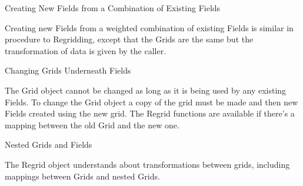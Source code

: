 \begin{description}
\item{Creating New Fields from a Combination of Existing Fields}

Creating new Fields from a weighted combination of existing
Fields is similar in procedure to Regridding, except that the
Grids are the same but the transformation of data is given 
by the caller.

\item{Changing Grids Underneath Fields}

The Grid object cannot be changed as long as it is being used
by any existing Fields.  To change the Grid object a copy of
the grid must be made and then new Fields created using the
new grid.  The Regrid functions are available if there's a 
mapping between the old Grid and the new one.

\item{Nested Grids and Fields}

The Regrid object understands about transformations between
grids, including mappings between Grids and nested Grids.

\end{description}


